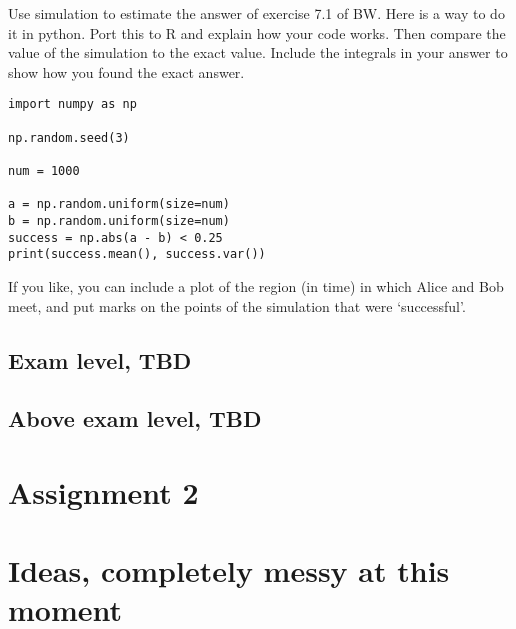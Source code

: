 \documentclass[a4paper]{article}
\begin{document}
\begin{exercise} 
Use simulation to estimate the answer of exercise 7.1 of BW.
Here is a way to do it in python.
Port this to R and explain how your code works.
Then compare the value of the simulation to the exact value.
Include the integrals in your answer to show how you found the exact answer.


\begin{verbatim}
import numpy as np

np.random.seed(3)

num = 1000

a = np.random.uniform(size=num)
b = np.random.uniform(size=num)
success = np.abs(a - b) < 0.25
print(success.mean(), success.var())
\end{verbatim}



If you like, you can include a plot of the region (in time) in which Alice and Bob meet, and put marks on the points of the simulation that were `successful'. 




\end{exercise}


\subsection{Exam level, TBD}
\label{sec:exam-level}


\subsection{Above exam level, TBD}
\label{sec:above-exam-level}


\section{Assignment 2}
\label{sec:assignment-2}



\section{Ideas, completely messy at this moment}
\label{sec:ideas-compl-messy}
\end{document}
